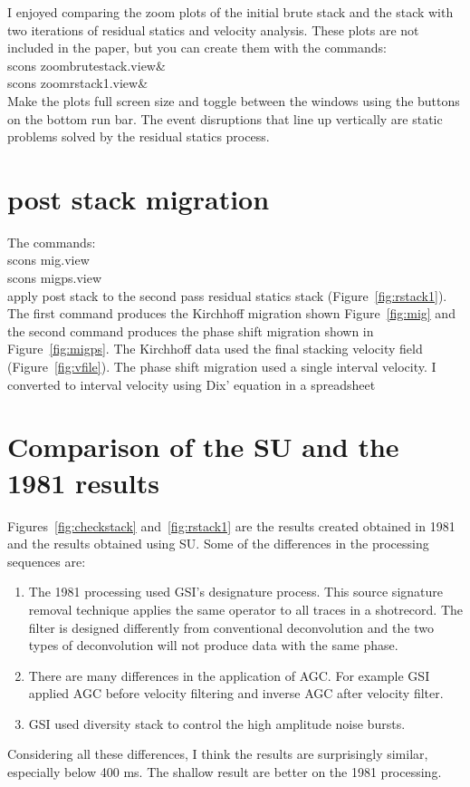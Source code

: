 I enjoyed comparing the zoom plots of the initial brute stack and the stack 
with two iterations of residual statics and velocity analysis.  These plots
are not included in the paper, but you can create them with the commands:\\
scons zoombrutestack.view\& \\
scons zoomrstack1.view\& \\
Make the plots full screen size and toggle between the windows using the 
buttons on the bottom run bar.  The event disruptions that line up vertically
are static problems solved by the residual statics process.
  

\section{post stack migration}
The commands:\\
scons mig.view\\
scons migps.view\\
apply post stack to the second pass residual statics stack 
(Figure~\ref{fig:rstack1}). The first command produces the Kirchhoff 
migration shown Figure~\ref{fig:mig} and the second command produces the 
phase shift migration shown in Figure~\ref{fig:migps}.  The Kirchhoff data 
used the final stacking velocity field (Figure~\ref{fig:vfile}).  The phase 
shift migration used a single interval velocity.  I converted to interval 
velocity using Dix' equation in a spreadsheet


\section{Comparison of the SU and the 1981 results}
Figures~\ref{fig:checkstack} and~\ref{fig:rstack1} are the results created 
obtained in 1981 and the results obtained using SU.  Some of the differences 
in the processing sequences are:
\begin{enumerate}
\item The 1981 processing used GSI's designature process.  This source 
signature removal technique applies the same operator to all traces in a 
shotrecord.  The filter is designed differently from conventional 
deconvolution and the two types of deconvolution will not produce data 
with the same phase. 
\item There are many differences in the application of AGC.  For example 
GSI applied AGC before velocity filtering and inverse AGC after velocity 
filter.
\item GSI used diversity stack to control the high amplitude noise bursts.
\end{enumerate}
Considering all these differences, I think the results are surprisingly 
similar, especially below 400 ms.  The shallow result are better on the 
1981 processing.

